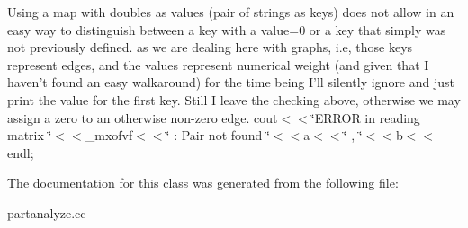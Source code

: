 Using a map with doubles as values (pair of strings as keys) does not allow in an easy way to distinguish between a key with a value=0 or a key that simply was not previously defined. as we are dealing here with graphs, i.e, those keys represent edges, and the values represent numerical weight (and given that I haven't found an easy walkaround) for the time being I'll silently ignore and just print the value for the first key. Still I leave the checking above, otherwise we may assign a zero to an otherwise non-zero edge. cout$<$$<$\char`\"{}ERROR in reading matrix \char`\"{}$<$$<$\_\-mxofvf$<$$<$\char`\"{} : Pair not found \char`\"{}$<$$<$a$<$$<$\char`\"{} , \char`\"{}$<$$<$b$<$$<$endl; 

The documentation for this class was generated from the following file:\begin{CompactItemize}
\item 
partanalyze.cc\end{CompactItemize}
